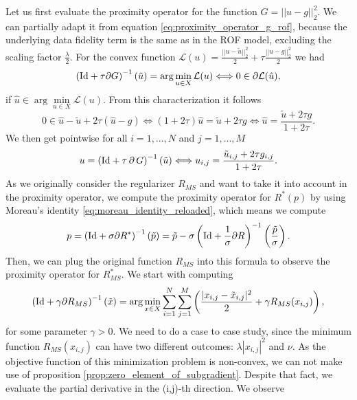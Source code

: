 \documentclass{scrreprt}
\begin{document}
            Let us first evaluate the proximity operator for the function $G = ||u - g||_{2}^{2}$. We can partially adapt it from equation \ref{eq:proximity_operator_g_rof}, because the underlying data fidelity term is the same as in the ROF model, excluding the scaling factor $\frac{\lambda}{2}$. For the convex function $\mathcal{L}(u) = \frac{||u - \tilde{u}||_{2}^{2}}{2} + \tau \frac{||u - g||_{2}^{2}}{2}$ we had
                $$
                    \left( \textnormal{Id} + \tau \partial G \right)^{-1}(\tilde{u}) = \arg \min_{u \in X} \mathcal{L}(u) \Longleftrightarrow 0 \in \partial \mathcal{L}(\hat{u}),
                $$
            if $\hat{u} \in \arg\min\limits_{u \in X} \mathcal{L}(u)$.
            From this characterization it follows
                $$
                    0 \in \hat{u} - \tilde{u} + 2\tau (\hat{u} - g) \Longleftrightarrow (1 + 2\tau)\hat{u} = \tilde{u} + 2\tau g \Longleftrightarrow \hat{u} = \frac{\tilde{u} + 2\tau g}{1 + 2\tau}.
                $$
            We then get pointwise for all $i = 1, ..., N$ and $j = 1, ..., M$
                $$
                    u = \left( \textnormal{Id} + \tau\,\partial\,G \right)^{-1}(\tilde{u}) \Longleftrightarrow u_{i,j} = \frac{\tilde{u}_{i,j} + 2\tau g_{i,j}}{1 + 2\tau}.
                $$
            As we originally consider the regularizer $R_{MS}$ and want to take it into account in the proximity operator, we compute the proximity operator for $R^{\ast}(p)$ by using Moreau's identity \ref{eq:moreau_identity_reloaded}, which means we compute
                \begin{equation}
                    p = \left( \textnormal{Id} + \sigma \partial R^{\ast} \right)^{-1}(\tilde{p}) = \tilde{p} - \sigma \left( \textnormal{Id} + \frac{1}{\sigma} \partial R \right)^{-1} \left(\frac{\tilde{p}}{\sigma} \right).
                \label{eq:moreau_mumford_shah_regularizer}
                \end{equation}
            Then, we can plug the original function $R_{MS}$ into this formula to observe the proximity operator for $R^{\ast}_{MS}$. We start with computing
                $$
                    \left( \textnormal{Id} + \gamma\partial R_{MS} \right)^{-1}(\tilde{x}) = \arg \min_{x \in X} \sum_{i = 1}^{N} \sum_{j = 1}^{M} \left( \frac{|x_{i,j} - \tilde{x}_{i,j}|^{2}}{2} + \gamma R_{MS}(x_{i,j}) \right),
                $$
            for some parameter $\gamma > 0$. We need to do a case to case study, since the minimum function $R_{MS}(x_{i,j})$ can have two different outcomes: $\lambda |x_{i,j}|^{2}$ and $\nu$. As the objective function of this minimization problem is non-convex, we can not make use of proposition \ref{prop:zero_element_of_subgradient}. Despite that fact, we evaluate the partial derivative in the (i,j)-th direction. We observe
\end{document}
